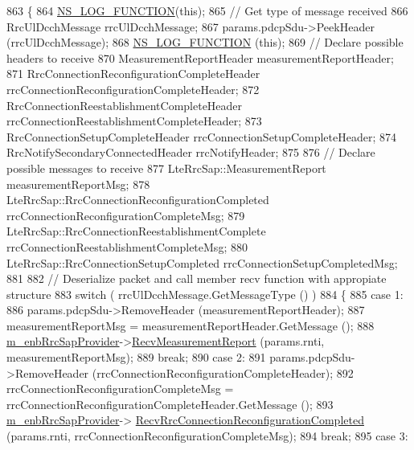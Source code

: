 \begin{DoxyCode}
863 \{
864  \hyperlink{log-macros-disabled_8h_a90b90d5bad1f39cb1b64923ea94c0761}{NS\_LOG\_FUNCTION}(\textcolor{keyword}{this});
865         \textcolor{comment}{// Get type of message received}
866   RrcUlDcchMessage rrcUlDcchMessage;
867   params.pdcpSdu->PeekHeader (rrcUlDcchMessage);
868   \hyperlink{log-macros-disabled_8h_a90b90d5bad1f39cb1b64923ea94c0761}{NS\_LOG\_FUNCTION} (\textcolor{keyword}{this});
869   \textcolor{comment}{// Declare possible headers to receive}
870   MeasurementReportHeader measurementReportHeader;
871   RrcConnectionReconfigurationCompleteHeader rrcConnectionReconfigurationCompleteHeader;
872   RrcConnectionReestablishmentCompleteHeader rrcConnectionReestablishmentCompleteHeader;
873   RrcConnectionSetupCompleteHeader rrcConnectionSetupCompleteHeader;
874   RrcNotifySecondaryConnectedHeader rrcNotifyHeader;
875 
876   \textcolor{comment}{// Declare possible messages to receive}
877   LteRrcSap::MeasurementReport measurementReportMsg;
878   LteRrcSap::RrcConnectionReconfigurationCompleted rrcConnectionReconfigurationCompleteMsg;
879   LteRrcSap::RrcConnectionReestablishmentComplete rrcConnectionReestablishmentCompleteMsg;
880   LteRrcSap::RrcConnectionSetupCompleted rrcConnectionSetupCompletedMsg;
881 
882   \textcolor{comment}{// Deserialize packet and call member recv function with appropiate structure}
883   \textcolor{keywordflow}{switch} ( rrcUlDcchMessage.GetMessageType () )
884     \{
885     \textcolor{keywordflow}{case} 1:
886       params.pdcpSdu->RemoveHeader (measurementReportHeader);
887       measurementReportMsg = measurementReportHeader.GetMessage ();
888       \hyperlink{classns3_1_1MmWaveLteEnbRrcProtocolReal_af89474441e0041b55d1e24a5bd73df15}{m\_enbRrcSapProvider}->\hyperlink{classns3_1_1LteEnbRrcSapProvider_abf788b7395d6a2bc7e0ab86a3f992695}{RecvMeasurementReport} (params.rnti,
      measurementReportMsg);
889       \textcolor{keywordflow}{break};
890     \textcolor{keywordflow}{case} 2:
891       params.pdcpSdu->RemoveHeader (rrcConnectionReconfigurationCompleteHeader);
892       rrcConnectionReconfigurationCompleteMsg = rrcConnectionReconfigurationCompleteHeader.GetMessage ();
893       \hyperlink{classns3_1_1MmWaveLteEnbRrcProtocolReal_af89474441e0041b55d1e24a5bd73df15}{m\_enbRrcSapProvider}->
      \hyperlink{classns3_1_1LteEnbRrcSapProvider_a551d1002a06181295debe624dfd1322b}{RecvRrcConnectionReconfigurationCompleted} (params.rnti,
      rrcConnectionReconfigurationCompleteMsg);
894       \textcolor{keywordflow}{break};
895     \textcolor{keywordflow}{case} 3:

\end{DoxyCode}

